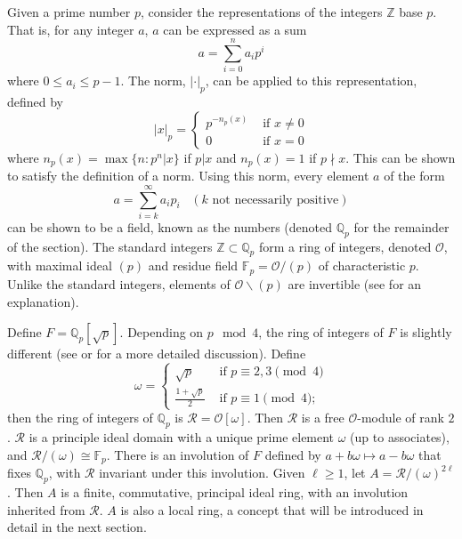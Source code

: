 Given a prime number $p$, consider the representations of the integers $\mathbb{Z}$ base $p$.
That is, for any integer $a$, $a$ can be expressed as a sum
\[
a = \sum_{i=0}^n a_i p^i
\]
where $0 \le a_i \le p - 1$.
The \padic norm, $|\cdot|_p$, can be applied to this representation, defined by
\[
|x|_p = \begin{cases}
p^{-n_p(x)} &\text{ if } x \ne 0\\
0 &\text{ if } x = 0
\end{cases}
\]
where $n_p(x) = \max \{n: p^n | x \}$ if $p | x$ and $n_p(x) = 1$ if $p \nmid x$.
This can be shown to satisfy the definition of a norm.
Using this norm, every element $a$ of the form
\[
a = \sum_{i=k}^\infty a_i p_i \;\;\; (k \text{ not necessarily positive})
\]
can be shown to be a field, known as the \padic numbers (denoted $\mathbb{Q}_p$ for the remainder of the section).
The standard integers $\mathbb{Z} \subset \mathbb{Q}_p$ form a ring of integers, denoted $\mathcal{O}$, 
with maximal ideal $(p)$ and residue field $\mathbb{F}_p = \mathcal{O}/(p)$ of characteristic $p$.
Unlike the standard integers, elements of $\mathcal{O} \backslash (p)$ are invertible (see \cite{katok} for an explanation).

Define $F = \mathbb{Q}_p [\sqrt{p}]$.
Depending on $p \mod 4$, the ring of integers of $F$ is slightly different (see \cite{milneANT} or \cite{samuel} for a more detailed discussion).
Define
\[
\omega = \begin{cases}
\sqrt{p} &\text{ if } p \equiv 2,3 \pmod{4}\\
\frac{1 + \sqrt{p}}{2} &\text{ if } p \equiv 1 \pmod{4};
\end{cases}
\]
then the ring of integers of $\mathbb{Q}_p$ is $\mathcal{R} = \mathcal{O}[\omega]$.
Then $\mathcal{R}$ is a free $\mathcal{O}$-module of rank $2$.
$\mathcal{R}$ is a principle ideal domain with a unique prime element $\omega$ (up to associates), and $\mathcal{R}/(\omega) \cong \mathbb{F}_p$.
There is an involution of $F$ defined by $a + b \omega \mapsto a - b \omega$ that fixes $\mathbb{Q}_p$, with $\mathcal{R}$ invariant under this involution.
Given $\ell \ge 1$, let $A = \mathcal{R} / (\omega)^{2\ell}$.
Then $A$ is a finite, commutative, principal ideal ring, with an involution inherited from $\mathcal{R}$.
$A$ is also a local ring, a concept that will be introduced in detail in the next section.


